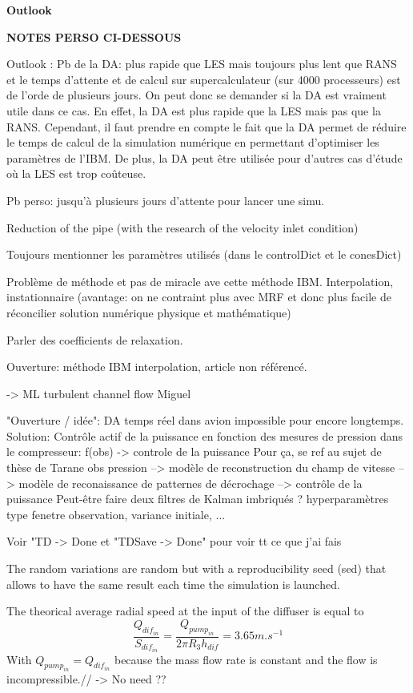 \textbf{Outlook}




\textbf{NOTES PERSO CI-DESSOUS}

Outlook : Pb de la DA: plus rapide que LES mais toujours plus lent que RANS et le temps d'attente et de calcul sur supercalculateur (sur 4000 processeurs) est de l'orde de plusieurs jours. On peut donc se demander si la DA est vraiment utile dans ce cas. En effet, la DA est plus rapide que la LES mais pas que la RANS. Cependant, il faut prendre en compte le fait que la DA permet de réduire le temps de calcul de la simulation numérique en permettant d'optimiser les paramètres de l'IBM. De plus, la DA peut être utilisée pour d'autres cas d'étude où la LES est trop coûteuse.

Pb perso: jusqu'à plusieurs jours d'attente pour lancer une simu.

Reduction of the pipe (with the research of the velocity inlet condition)

Toujours mentionner les paramètres utilisés (dans le controlDict et le conesDict)

Problème de méthode et pas de miracle ave cette méthode IBM. Interpolation, instationnaire (avantage: on ne contraint plus avec MRF et donc plus facile de réconcilier solution numérique physique et mathématique)

Parler des coefficients de relaxation.


Ouverture: méthode IBM interpolation, article non référencé.

\cite{valeroEnhancedStateEstimation2025} -> ML turbulent channel flow Miguel

"Ouverture / idée": DA temps réel dans avion impossible pour encore longtemps.
Solution: Contrôle actif de la puissance en fonction des mesures de pression dans le compresseur:
f(obs) -> controle de la puissance
Pour ça, se ref au sujet de thèse de Tarane
obs pression --> modèle de reconstruction du champ de vitesse --> modèle de reconaissance de patternes de décrochage --> contrôle de la puissance
Peut-être faire deux filtres de Kalman imbriqués ? hyperparamètres type fenetre observation, variance initiale, ...


Voir "TD -> Done et "TDSave -> Done" pour voir tt ce que j'ai fais

The random variations are random but with a reproducibility seed (sed) that allows to have the same result each time the simulation is launched.


The theorical average radial speed at the input of the diffuser is equal to \[\frac{Q_{dif_{in}}}{S_{dif_{in}}} = \frac{Q_{pump_{in}}}{2\pi R_{3} h_{dif}} = 3.65m.s^{-1}\]
With $Q_{pump_{in}} = Q_{dif_{in}}$ because the mass flow rate is constant and the flow is incompressible.// -> No need ??

